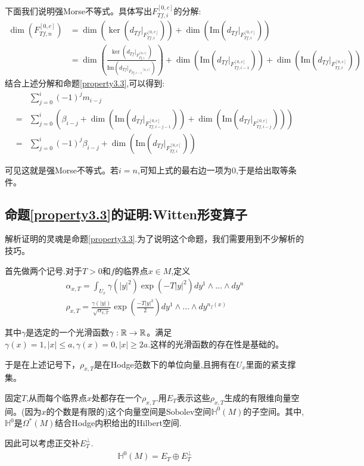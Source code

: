 下面我们说明强Morse不等式。具体写出$F_{Tf,i}^{[0,c]}$的分解:
\begin{align}
	\dim(F_{Tf,n}^{[0,c]})&=\dim(\ker(d_{Tf}|_{F_{Tf,i}^{[0,c]}}))+\dim(\mathrm{Im}(d_{Tf}|_{F_{Tf,i}^{[0,c]}}))\\&=\dim(\frac{\ker(d_{Tf}|_{F_{Tf,i}^{[0,c]}})}{\mathrm{Im}(d_{Tf}|_{{F_{Tf,i-1}}^{[0,c]}})})+\dim(\mathrm{Im}(d_{Tf}|_{F_{Tf,i-1}^{[0,c]}}))+\dim(\mathrm{Im}(d_{Tf}|_{F_{Tf,i}^{[0,c]}}))
\end{align}
结合上述分解和命题\ref{property3.3},可以得到:
\begin{align}
	&\sum_{j=0}^i (-1)^j m_{i-j}\\=&\sum_{j=0}^i(\beta_{i-j}+\dim(\mathrm{Im}(d_{Tf}|_{F_{Tf,i-j-1}^{[0,c]}}))+\dim(\mathrm{Im}(d_{Tf}|_{F_{Tf,i-j}^{[0,c]}})))\\=& \sum_{j=0}^i (-1)^j \beta_{i-j}+\dim(\mathrm{Im}(d_{Tf}|_{F_{Tf,i}^{[0,c]}}))
\end{align}

可见这就是强Morse不等式。若$i=n$,可知上式的最右边一项为$0$,于是给出取等条件。
\subsection{命题\ref{property3.3}的证明:Witten形变算子}
解析证明的灵魂是命题\ref{property3.3}.为了说明这个命题，我们需要用到不少解析的技巧。

首先做两个记号.对于$T>0$和$f$的临界点$x \in M$,定义
\begin{align*}
    \alpha_{x,T}=\int_{U_x}\gamma(|y|^2)\exp(-T|y|^2)dy^1\wedge \dots \wedge dy^n\\
	\rho_{x,T}=\frac{\gamma(|y|)}{\sqrt{\alpha_{x,T}}}\exp(\frac{-T|y|^2}{2})dy^1\wedge \dots \wedge dy^{n_f(x)}
\end{align*}

其中$\gamma$是选定的一个光滑函数$\gamma:\mathbb{R} \to \mathbb{R}$。满足$\gamma(x)=1,|x|\leq a,\gamma(x)=0,|x|\geq 2a$.这样的光滑函数的存在性是基础的。

于是在上述记号下，$\rho_{x,T}$是在Hodge范数下的单位向量,且拥有在$U_x$里面的紧支撑集。

固定$T$,从而每个临界点$x$处都存在一个$\rho_{x,T}$.用$E_T$表示这些$\rho_{x,T}$生成的有限维向量空间。(因为$x$的个数是有限的)这个向量空间是Sobolev空间$\mathbb{H}^0(M)$的子空间。其中,$\mathbb{H}^0$是$\Omega^*(M)$结合Hodge内积给出的Hilbert空间.

因此可以考虑正交补$E_T^{\perp}$.
\begin{align*}
	\mathbb{H}^0(M)=E_T \oplus E_T^{\perp}
\end{align*}

